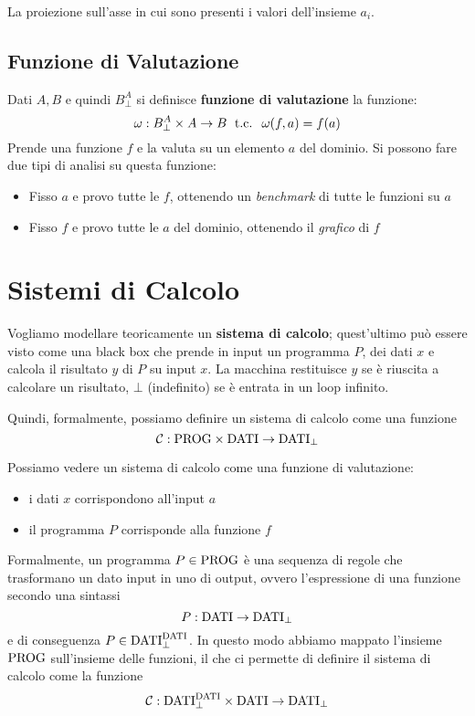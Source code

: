 La proiezione sull'asse in cui sono presenti i valori dell'insieme $a_i$.

\subsection{Funzione di Valutazione}
Dati $A,B$ e quindi $B^A_\bot$ si definisce \textbf{funzione di valutazione} la funzione:
$$ \omega: B^A_\bot \times A \rightarrow B \; \text{ t.c. } \; \omega (f,a) = f(a) $$
Prende una funzione $f$ e la valuta su un elemento $a$ del dominio. Si possono fare due tipi di analisi su questa funzione: 
\begin{itemize}
	\item Fisso $a$ e provo tutte le $f$, ottenendo un \textit{benchmark} di tutte le funzioni su $a$
	
    \item Fisso $f$ e provo tutte le $a$ del dominio, ottenendo il \textit{grafico} di $f$
\end{itemize}

\section{Sistemi di Calcolo}

Vogliamo modellare teoricamente un \textbf{sistema di calcolo}; quest'ultimo può essere visto come una black box che prende in input un programma $P$, dei dati $x$ e calcola il risultato $y$ di $P$ su input $x$. La macchina restituisce $y$ se è riuscita a calcolare un risultato, $\bot$ (indefinito) se è entrata in un loop infinito.
\begin{center}
	
\end{center}

Quindi, formalmente, possiamo definire un sistema di calcolo come una funzione 
$$ \mathcal{C}: \text{PROG} \times \text{DATI} \rightarrow \text{DATI}_\bot $$

Possiamo vedere un sistema di calcolo come una funzione di valutazione:
\begin{itemize}
	\item i dati $x$ corrispondono all'input $a$
	
    \item il programma $P$ corrisponde alla funzione $f$
\end{itemize}

Formalmente, un programma $P \in \text{PROG}$ è una sequenza di regole che trasformano un dato input in uno di output, ovvero l'espressione di una funzione secondo una sintassi 
$$ P: \text{DATI} \rightarrow \text{DATI}_\bot $$
e di conseguenza $P \in \text{DATI}^{\text{DATI}}_\bot$. In questo modo abbiamo mappato l'insieme $\text{PROG}$ sull'insieme delle funzioni, il che ci permette di definire il sistema di calcolo come la funzione
$$ \mathcal{C}: \text{DATI}^{\text{DATI}}_\bot \times \text{DATI} \rightarrow \text{DATI}_{\bot} $$


